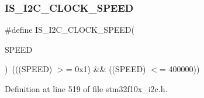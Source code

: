 \subsubsection{\texorpdfstring{I\+S\+\_\+\+I2\+C\+\_\+\+C\+L\+O\+C\+K\+\_\+\+S\+P\+E\+ED}{IS\_I2C\_CLOCK\_SPEED}}
{\footnotesize\ttfamily \#define I\+S\+\_\+\+I2\+C\+\_\+\+C\+L\+O\+C\+K\+\_\+\+S\+P\+E\+ED(\begin{DoxyParamCaption}\item[{}]{S\+P\+E\+ED }\end{DoxyParamCaption})~(((S\+P\+E\+ED) $>$= 0x1) \&\& ((\+S\+P\+E\+E\+D) $<$= 400000))}



Definition at line 519 of file stm32f10x\+\_\+i2c.\+h.

